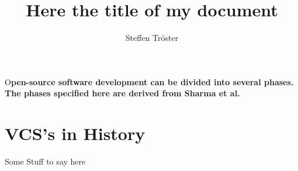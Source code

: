 \documentclass[DIV=calc,paper=a4,fontsize=11pt,twocolumn]{scrartcl}
\title{Here the title of my document}					%
\author{Steffen Tröster \\}											%
\date{}																%
\newcommand{\initial}[1]{%
     \lettrine[lines=3,lhang=0.3,nindent=0em]{
                    \color{DarkGoldenrod}
                    {\textsf{#1}}}{}}
\begin{document}
\maketitle
\thispagestyle{fancy}		%
\initial{O}\textbf{pen-source software development can be divided into several phases. The phases specified here are derived from Sharma et al. \citep{ZitovaF03}}

\section{VCS's in History}
Some Stuff to say here



\end{document}

